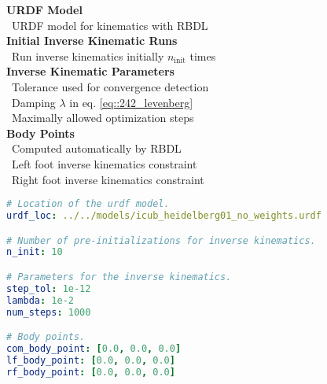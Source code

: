 \begin{minipage}[t]{1.\textwidth}
	\hspace*{-1cm}
	\begin{minipage}{0.4\textwidth}
		\scriptsize{
			\hfill \textbf{URDF Model}\\
			\mbox{}~\hfill URDF model for kinematics with RBDL\\
			
			\hfill \textbf{Initial Inverse Kinematic Runs}\\
			\mbox{}~\hfill Run inverse kinematics initially $n_\text{init}$ times\\
			
			\hfill \textbf{Inverse Kinematic Parameters}\\
			\mbox{}~\hfill Tolerance used for convergence detection\\
			\mbox{}~\hfill Damping $\lambda$ in eq. \ref{eq::242_levenberg}\\
			\mbox{}~\hfill Maximally allowed optimization steps\\
			
			\hfill \textbf{Body Points}\\
			\mbox{}~\hfill Computed automatically by RBDL\\
			\mbox{}~\hfill Left foot inverse kinematics constraint\\
			\mbox{}~\hfill Right foot inverse kinematics constraint}
	\end{minipage}
	\begin{minipage}{0.6\textwidth}
		\begin{lstlisting}[language=yaml]
# Location of the urdf model.
urdf_loc: ../../models/icub_heidelberg01_no_weights.urdf

# Number of pre-initializations for inverse kinematics.
n_init: 10

# Parameters for the inverse kinematics.
step_tol: 1e-12
lambda: 1e-2
num_steps: 1000

# Body points.
com_body_point: [0.0, 0.0, 0.0]
lf_body_point: [0.0, 0.0, 0.0]
rf_body_point: [0.0, 0.0, 0.0]
		\end{lstlisting}
	\end{minipage}
	\label{sec::32_ki_conf}
\end{minipage}






